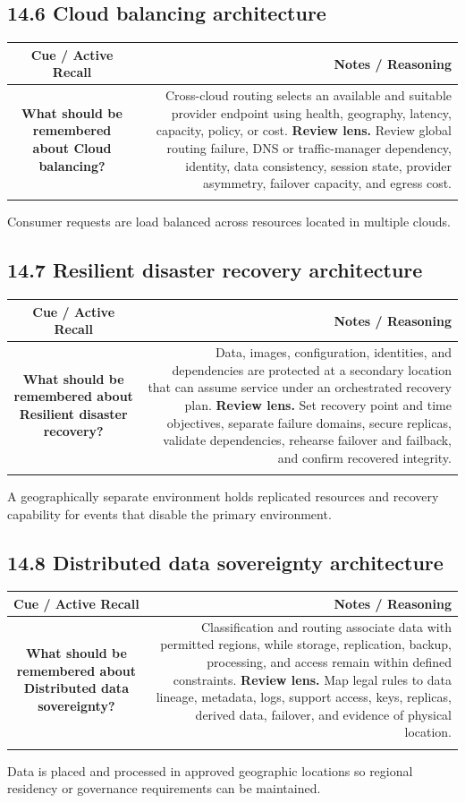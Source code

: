 \documentclass[11pt]{article}
\newcommand{\CornellHeader}{\rowcolor{Navy}\color{white}\bfseries Cue / Active Recall & \color{white}\bfseries Notes / Reasoning \\\endhead}
\newcommand{\CornellRow}[2]{\cellcolor{CueGray}\textbf{#1} & #2 \\\addlinespace[3pt]}
\begin{document}
\subsection{14.6 Cloud balancing architecture}
\begin{longtable}{@{}C N@{}}
\CornellHeader
\CornellRow{What should be remembered about Cloud balancing?}{Cross-cloud routing selects an available and suitable provider endpoint using health, geography, latency, capacity, policy, or cost. \textbf{Review lens.} Review global routing failure, DNS or traffic-manager dependency, identity, data consistency, session state, provider asymmetry, failover capacity, and egress cost.}
\end{longtable}
\begin{sectionsummarybox}
Consumer requests are load balanced across resources located in multiple clouds.
\end{sectionsummarybox}
\subsection{14.7 Resilient disaster recovery architecture}
\begin{longtable}{@{}C N@{}}
\CornellHeader
\CornellRow{What should be remembered about Resilient disaster recovery?}{Data, images, configuration, identities, and dependencies are protected at a secondary location that can assume service under an orchestrated recovery plan. \textbf{Review lens.} Set recovery point and time objectives, separate failure domains, secure replicas, validate dependencies, rehearse failover and failback, and confirm recovered integrity.}
\end{longtable}
\begin{sectionsummarybox}
A geographically separate environment holds replicated resources and recovery capability for events that disable the primary environment.
\end{sectionsummarybox}
\subsection{14.8 Distributed data sovereignty architecture}
\begin{longtable}{@{}C N@{}}
\CornellHeader
\CornellRow{What should be remembered about Distributed data sovereignty?}{Classification and routing associate data with permitted regions, while storage, replication, backup, processing, and access remain within defined constraints. \textbf{Review lens.} Map legal rules to data lineage, metadata, logs, support access, keys, replicas, derived data, failover, and evidence of physical location.}
\end{longtable}
\begin{sectionsummarybox}
Data is placed and processed in approved geographic locations so regional residency or governance requirements can be maintained.
\end{sectionsummarybox}
\end{document}
